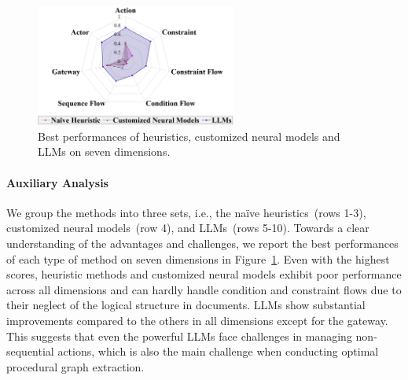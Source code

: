 \begin{figure}[t]
    \centering
    \includegraphics[height=4cm]{figures/Radar.png}

    \caption{Best performances of heuristics, customized neural models and LLMs on seven dimensions.
    }
    \label{fig:Radar}

\end{figure}

\phantom{Invisible Text}
\vspace{-\baselineskip}

\paragraph{Auxiliary Analysis}

We group the methods into three sets, i.e., the na\"ive heuristics~(rows 1-3), customized neural models~(row 4), and LLMs~(rows 5-10). Towards a clear understanding of the advantages and challenges, we report the best performances of each type of method on seven dimensions in Figure~\ref{fig:Radar}. Even with the highest scores, heuristic methods and customized neural models exhibit poor performance across all dimensions and can hardly handle condition and constraint flows due to their neglect of the logical structure in documents. LLMs show substantial improvements compared to the others in all dimensions except for the gateway. This suggests that even the powerful LLMs face challenges in managing non-sequential actions, which is also the main challenge when conducting optimal procedural graph extraction.
%